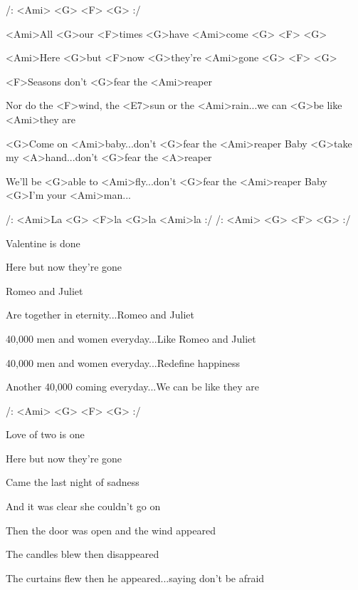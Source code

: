 

/: <Ami> <G> <F> <G> :/



\zs

<Ami>All <G>our <F>times <G>have <Ami>come <G> <F> <G>

<Ami>Here <G>but <F>now <G>they're <Ami>gone <G> <F> <G>

<F>Seasons don't <G>fear the <Ami>reaper

Nor do the <F>wind, the <E7>sun or the <Ami>rain...we can <G>be like <Ami>they are
\ks

\zr
<G>Come on <Ami>baby...don't <G>fear the <Ami>reaper
Baby <G>take my <A>hand...don't <G>fear the <A>reaper

We'll be <G>able to <Ami>fly...don't <G>fear the <Ami>reaper
Baby <G>I'm your <Ami>man...

/: <Ami>La <G> <F>la <G>la <Ami>la :/
/: <Ami> <G> <F> <G> :/
\kr


\zs
Valentine is done

Here but now they're gone

Romeo and Juliet

Are together in eternity...Romeo and Juliet

40,000 men and women everyday...Like Romeo and Juliet

40,000 men and women everyday...Redefine happiness

Another 40,000 coming everyday...We can be like they are
\ks

\zr
\kr

/: <Ami> <G> <F> <G> :/

\zs

Love of two is one

Here but now they're gone

Came the last night of sadness

And it was clear she couldn't go on

Then the door was open and the wind appeared

The candles blew then disappeared

The curtains flew then he appeared...saying don't be afraid
\ks

\zr
\kr


\kp
